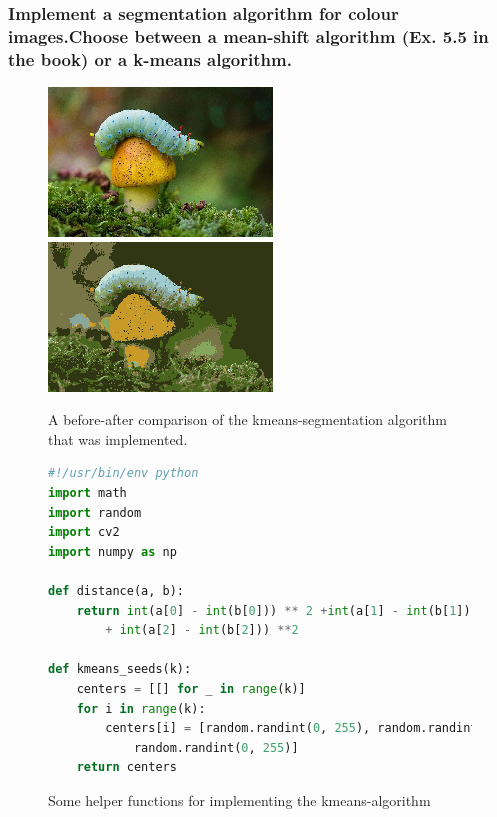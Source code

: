 \documentclass[a4paper, titlepage,12pt]{article}
\begin{document}
	\subsubsection*{Implement a segmentation algorithm for colour images.Choose between a mean-shift algorithm (Ex. 5.5 in the book) or a
k-means algorithm.}

\begin{figure}[H]
	\begin{center}
		\includegraphics[scale=0.8]{./caterpillar.jpg}
		\includegraphics[scale=0.8]{./kmeans_segmentation.png}
		\caption{A before-after comparison of the kmeans-segmentation algorithm that was implemented.}
	\end{center}
\end{figure}

\begin{figure}[H]
	\begin{center}
		\begin{lstlisting}[language=Python]
#!/usr/bin/env python
import math
import random
import cv2
import numpy as np

def distance(a, b):
    return int(a[0] - int(b[0])) ** 2 +int(a[1] - int(b[1])) ** 2 
		+ int(a[2] - int(b[2])) **2

def kmeans_seeds(k):
    centers = [[] for _ in range(k)]
    for i in range(k):
        centers[i] = [random.randint(0, 255), random.randint(0, 255), 
			random.randint(0, 255)]
    return centers
		\end{lstlisting}
		\caption{Some helper functions for implementing the kmeans-algorithm}
	\end{center}
\end{figure}
\end{document}
